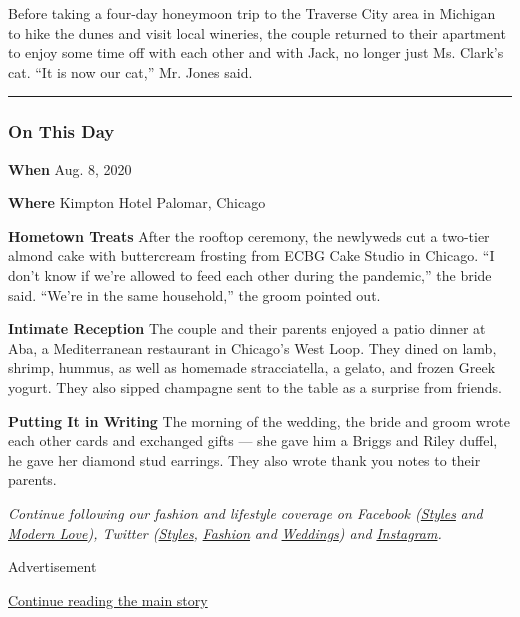 Before taking a four-day honeymoon trip to the Traverse City area in
Michigan to hike the dunes and visit local wineries, the couple returned
to their apartment to enjoy some time off with each other and with Jack,
no longer just Ms. Clark's cat. ``It is now our cat,'' Mr. Jones said.

\begin{center}\rule{0.5\linewidth}{\linethickness}\end{center}

\hypertarget{on-this-day}{%
\subsubsection{On This Day}\label{on-this-day}}

\textbf{When} Aug. 8, 2020

\textbf{Where} Kimpton Hotel Palomar, Chicago

\textbf{Hometown Treats} After the rooftop ceremony, the newlyweds cut a
two-tier almond cake with buttercream frosting from ECBG Cake Studio in
Chicago. ``I don't know if we're allowed to feed each other during the
pandemic,'' the bride said. ``We're in the same household,'' the groom
pointed out.

\textbf{Intimate Reception} The couple and their parents enjoyed a patio
dinner at Aba, a Mediterranean restaurant in Chicago's West Loop. They
dined on lamb, shrimp, hummus, as well as homemade stracciatella, a
gelato, and frozen Greek yogurt. They also sipped champagne sent to the
table as a surprise from friends.

\textbf{Putting It in Writing} The morning of the wedding, the bride and
groom wrote each other cards and exchanged gifts --- she gave him a
Briggs and Riley duffel, he gave her diamond stud earrings. They also
wrote thank you notes to their parents.

\emph{Continue following our fashion and lifestyle coverage on Facebook
(}\href{https://www.facebookcorewwwi.onion/nytimesstyles}{\emph{Styles}}
\emph{and}
\href{https://www.facebookcorewwwi.onion/modernlove}{\emph{Modern
Love}}\emph{), Twitter
(}\href{https://twitter.com/nytstyles}{\emph{Styles}}\emph{,}
\href{https://twitter.com/nytfashion}{\emph{Fashion}} \emph{and}
\href{https://twitter.com/nytimesvows}{\emph{Weddings}}\emph{) and}
\href{https://instagram.com/nytimesfashion}{\emph{Instagram}}\emph{.}

Advertisement

\protect\hyperlink{after-bottom}{Continue reading the main story}

